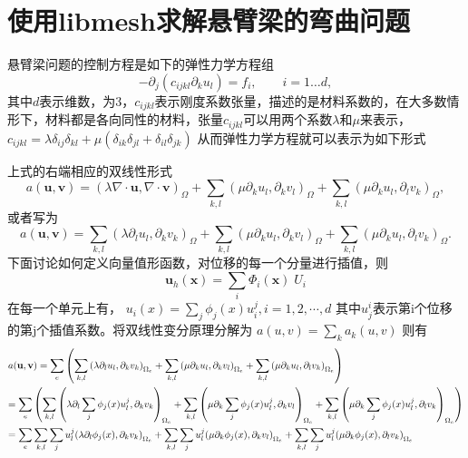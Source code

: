 \section{使用libmesh求解悬臂梁的弯曲问题}

悬臂梁问题的控制方程是如下的弹性力学方程组
	\[ - {\partial _j}({c_{ijkl}}{\partial _k}{u_l}) = {f_i},\qquad i = 1 \ldots d,\]
其中$d$表示维数，为3，${c_{ijkl}}$表示刚度系数张量，描述的是材料系数的，在大多数情形下，材料都是各向同性的材料，张量${c_{ijkl}}$可以用两个系数$\lambda $和$\mu $来表示，
${c_{ijkl}} = \lambda {\delta _{ij}}{\delta _{kl}} + \mu ({\delta _{ik}}{\delta _{jl}} + {\delta _{il}}{\delta _{jk}})$
从而弹性力学方程就可以表示为如下形式
	 
上式的右端相应的双线性形式
	\[a({\mathbf{u}},{\mathbf{v}}) = {\left( {\lambda \nabla \cdot{\mathbf{u}},\nabla \cdot{\mathbf{v}}} \right)_\Omega } + \sum\limits_{k,l} {{{\left( {\mu {\partial _k}{u_l},{\partial _k}{v_l}} \right)}_\Omega }}  + \sum\limits_{k,l} {{{\left( {\mu {\partial _k}{u_l},{\partial _l}{v_k}} \right)}_\Omega }} ,\]
或者写为
	\[a({\mathbf{u}},{\mathbf{v}}) = \sum\limits_{k,l} {{{\left( {\lambda {\partial _l}{u_l},{\partial _k}{v_k}} \right)}_\Omega }}  + \sum\limits_{k,l} {{{\left( {\mu {\partial _k}{u_l},{\partial _k}{v_l}} \right)}_\Omega }}  + \sum\limits_{k,l} {{{\left( {\mu {\partial _k}{u_l},{\partial _l}{v_k}} \right)}_\Omega }} .\]
下面讨论如何定义向量值形函数，对位移的每一个分量进行插值，则
	\[{{\mathbf{u}}_h}({\mathbf{x}}) = \sum\limits_i {{\Phi _i}} ({\mathbf{x}})\;{U_i}\]
在每一个单元上有，
${u_i}(x) = \sum\limits_j {{\phi _j}(x)u_i^j} ,i = 1,2, \cdots ,d$
其中$u_j^i$表示第i个位移的第j个插值系数。将双线性变分原理分解为
$a(u,v) = \sum\limits_k {{a_k}(u,v)} $
则有
\[\begin{gathered}
  a({\mathbf{u}},{\mathbf{v}}) = \sum\limits_e {\left( {\sum\limits_{k,l} {{{\left( {\lambda {\partial _l}{u_l},{\partial _k}{v_k}} \right)}_{{\Omega _e}}}}  + \sum\limits_{k,l} {{{\left( {\mu {\partial _k}{u_l},{\partial _k}{v_l}} \right)}_{{\Omega _e}}}}  + \sum\limits_{k,l} {{{\left( {\mu {\partial _k}{u_l},{\partial _l}{v_k}} \right)}_{{\Omega _e}}}} } \right)}  \hfill \\
   = \sum\limits_e {\left( {\sum\limits_{k,l} {{{\left( {\lambda {\partial _l}\sum\limits_j {{\phi _j}(x)u_l^j} ,{\partial _k}{v_k}} \right)}_{{\Omega _e}}}}  + \sum\limits_{k,l} {{{\left( {\mu {\partial _k}\sum\limits_j {{\phi _j}(x)u_l^j} ,{\partial _k}{v_l}} \right)}_{{\Omega _e}}}}  + \sum\limits_{k,l} {{{\left( {\mu {\partial _k}\sum\limits_j {{\phi _j}(x)u_l^j} ,{\partial _l}{v_k}} \right)}_{{\Omega _e}}}} } \right)}  \hfill \\
   = \sum\limits_e {\sum\limits_{k,l} {\sum\limits_j {u_l^j} {{\left( {\lambda {\partial _l}{\phi _j}(x),{\partial _k}{v_k}} \right)}_{{\Omega _e}}}}  + \sum\limits_{k,l} {\sum\limits_j {u_l^j} {{\left( {\mu {\partial _k}{\phi _j}(x),{\partial _k}{v_l}} \right)}_{{\Omega _e}}}}  + \sum\limits_{k,l} {\sum\limits_j {u_l^j} {{\left( {\mu {\partial _k}{\phi _j}(x),{\partial _l}{v_k}} \right)}_{{\Omega _e}}}} }  \hfill \\ 
\end{gathered} \]
